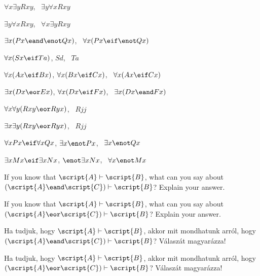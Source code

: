\begin{earg}
\item $\forall x\exists y Rxy$, \therefore\ $\exists y\forall x Rxy$
\item $\exists y\forall x Rxy$, \therefore\ $\forall x\exists y Rxy$
\item $\exists x(Px \eand \enot Qx)$, \therefore\ $\forall x(Px \eif \enot Qx)$
\item $\forall x(Sx \eif Ta)$, $Sd$, \therefore\ $Ta$
\item $\forall x(Ax\eif Bx)$, $\forall x(Bx \eif Cx)$, \therefore\ $\forall x(Ax \eif Cx)$
\item $\exists x(Dx \eor Ex)$, $\forall x(Dx \eif Fx)$, \therefore\ $\exists x(Dx \eand Fx)$
\item $\forall x\forall y(Rxy \eor Ryx)$, \therefore\ $Rjj$
\item $\exists x\exists y(Rxy \eor Ryx)$, \therefore\ $Rjj$
\item $\forall x Px \eif \forall x Qx$, $\exists x \enot Px$, \therefore\ $\exists x \enot Qx$
\item $\exists x Mx \eif \exists x Nx$, $\enot \exists x Nx$, \therefore\ $\forall x \enot Mx$
\end{earg}



\problempart
\begin{earg}
\item If you know that $\script{A}\vdash\script{B}$, what can you say about $(\script{A}\eand\script{C})\vdash\script{B}$? Explain your answer.
\item If you know that $\script{A}\vdash\script{B}$, what can you say about $(\script{A}\eor\script{C})\vdash\script{B}$? Explain your answer.
\end{earg}

\problempart
\begin{earg}
\item Ha tudjuk, hogy  $\script{A}\vdash\script{B}$, akkor mit mondhatunk arról, hogy $(\script{A}\eand\script{C})\vdash\script{B}$? Válaszát magyarázza!
\item Ha tudjuk, hogy  $\script{A}\vdash\script{B}$, akkor mit mondhatunk arról, hogy $(\script{A}\eor\script{C})\vdash\script{B}$? Válaszát magyarázza!
\end{earg}




